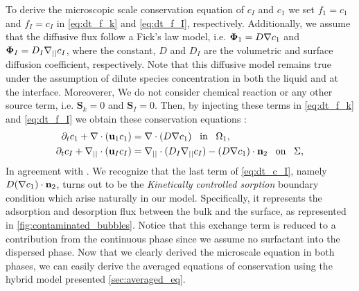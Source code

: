 To derive the microscopic scale conservation equation of $c_I$ and $c_1$ we set $f_1 = c_1$ and $f_I = c_I$ in \ref{eq:dt_f_k} and \ref{eq:dt_f_I}, respectively.
Additionally, we assume that the  diffusive flux follow a Fick's law model, i.e.  $\mathbf{\Phi}_1 = D\mathbf{\nabla} c_1$ and $\mathbf{\Phi}_I = D_I\mathbf{\nabla}_{||} c_I$,
where the constant,  $D$ and $D_I$ are the volumetric and surface diffusion coefficient, respectively.
Note that this diffusive model remains true under the assumption of dilute species concentration in both the liquid and at the interface.
Moreoverer, We do not consider chemical reaction or any other source term, i.e. $\textbf{S}_k = 0$ and $\textbf{S}_I=0$. 
Then, by injecting these terms in \ref{eq:dt_f_k} and \ref{eq:dt_f_I} we obtain these conservation equations : 
\begin{align}
    \partial_t c_1
    + \mathbf{\nabla} \cdot (\textbf{u}_1 c_1)
    &= \mathbf{\nabla} \cdot (D \mathbf{\nabla} c_1)
    \;\;\; \text{in} \;\;\; \Omega_1,\\
    \partial_t c_I
    + \mathbf{\nabla}_{||} \cdot (\textbf{u}_I c_I)
    &= \mathbf{\nabla}_{||} \cdot (D_I \mathbf{\nabla}_{||} c_I)
    - (D \mathbf{\nabla} c_1)\cdot \textbf{n}_2
    \;\;\; \text{on} \;\;\; \Sigma,
    \label{eq:dt_c_I}
\end{align}
In agreement with \citet{pesci2018computational,manikantan2020surfactant}.
We recognize that the last term of \ref{eq:dt_c_I}, namely $D(\mathbf{\nabla} c_1 ) \cdot \textbf{n}_2$, turns out to be the \textit{Kinetically controlled sorption} boundary condition \citet{pesci2018computational,manikantan2020surfactant} which arise naturally in our model.
Specifically, it represents the adsorption and desorption flux between the bulk and the surface, as represented in \ref{fig:contaminated_bubbles}.
Notice that this exchange term is reduced to a contribution from the continuous phase since we assume no surfactant into the dispersed phase. 
Now that we clearly derived the microscale equation in both phases, we can easily derive the averaged equations of conservation using the hybrid model presented \ref{sec:averaged_eq}.

